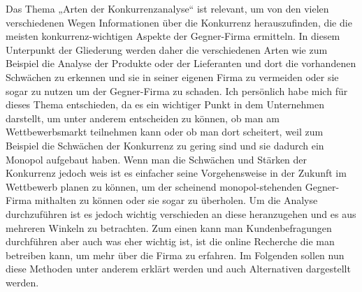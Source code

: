 \begin{refsection}
  
  Das Thema „Arten der Konkurrenzanalyse“ ist relevant, um von den vielen verschiedenen Wegen Informationen über die Konkurrenz herauszufinden, die die meisten konkurrenz-wichtigen Aspekte der Gegner-Firma ermitteln. In diesem Unterpunkt der Gliederung werden daher die verschiedenen Arten wie zum Beispiel die Analyse der Produkte oder der Lieferanten und dort die vorhandenen Schwächen zu erkennen und sie in seiner eigenen Firma zu vermeiden oder sie sogar zu nutzen um der Gegner-Firma zu schaden. Ich persönlich habe mich für dieses Thema entschieden, da es ein wichtiger Punkt in dem Unternehmen darstellt, um unter anderem entscheiden zu können, ob man am Wettbewerbsmarkt teilnehmen kann oder ob man dort scheitert, weil zum Beispiel die Schwächen der Konkurrenz zu gering sind und sie dadurch ein Monopol aufgebaut haben. Wenn man die Schwächen und Stärken der Konkurrenz jedoch weis ist es einfacher seine Vorgehensweise in der Zukunft im Wettbewerb planen zu können, um der scheinend monopol-stehenden Gegner-Firma mithalten zu können oder sie sogar zu überholen. Um die Analyse durchzuführen ist es jedoch wichtig verschieden an diese heranzugehen und es aus mehreren Winkeln zu betrachten. Zum einen kann man Kundenbefragungen durchführen aber auch was eher wichtig ist, ist die online Recherche die man betreiben kann, um mehr über die Firma zu erfahren. Im Folgenden sollen nun diese Methoden unter anderem erklärt werden und auch Alternativen dargestellt werden.

  \clearpage
  \printbibliography[heading=subsubbibliography]
\end{refsection}
\clearpage
